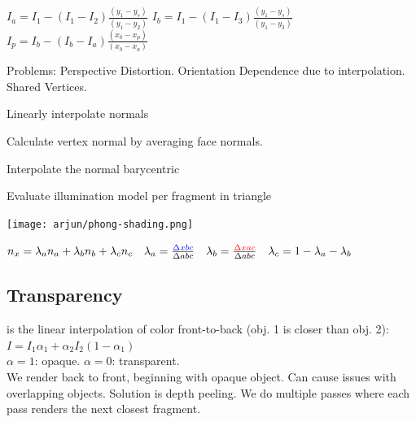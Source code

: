 $I_a = I_1 - (I_1 - I_2)\frac{(y_1-y_s)}{(y_1 - y_2)}$  
$I_b = I_1 - \left(I_1 - I_3\right) \frac{\left(y_1 - y_s\right)}{\left(y_1 - y_3\right)}$ 
$I_p = I_b - \left(I_b - I_a\right) \frac{\left(x_b - x_p\right)}{\left(x_b - x_a\right)}
$

Problems: Perspective Distortion. Orientation Dependence due to interpolation. Shared Vertices.

 Linearly interpolate normals
\begin{compactenum}
    \item Calculate vertex normal by averaging face normals.
    \item Interpolate the normal barycentric
    \item Evaluate illumination model per fragment in triangle
\end{compactenum}
\begin{center}
    \texttt{[image: arjun/phong-shading.png]}
\end{center}

$ n_x = \lambda_an_a + \lambda_bn_b + \lambda_cn_c  \quad \lambda_a = \frac{\color{blue} \Delta xbc}{\Delta abc} \quad \lambda_b = \frac{\color{red} \Delta xac}{\Delta abc} \quad \lambda_c = 1 - \lambda_a - \lambda_b$ 

\subsection*{Transparency}
 is the linear interpolation of color front-to-back (obj. 1 is closer than obj. 2): $I = I_1 \alpha_1 + \alpha_2 I_2 (1 - \alpha_1)$\\
$\alpha = 1 $: opaque. $\alpha = 0$: transparent.\\
We render back to front, beginning with opaque object. Can cause issues with overlapping objects. Solution is depth peeling. We do multiple passes where each pass renders the next closest fragment.